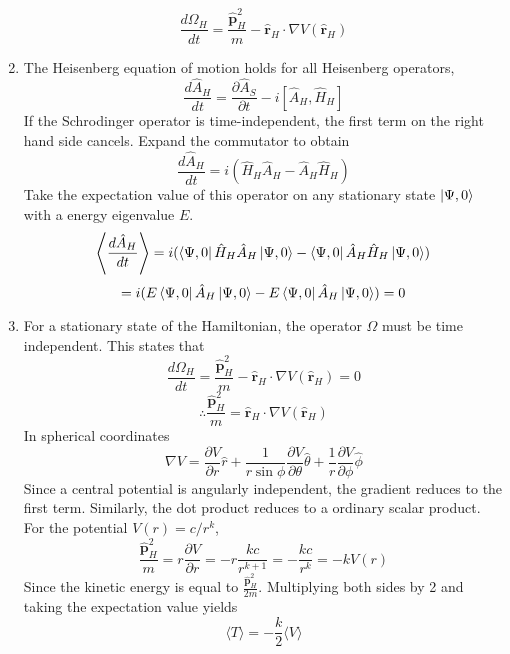 \begin{sol}
\begin{enumerate}[label=\textbf{(\alph*)}]
\begin{equation}
	\frac{d\Omega_H}{dt}=\frac{\hat{\mathbf p}_H^2}{m}-\hat {\mathbf r}_H\cdot\nabla V(\hat {\mathbf r}_H)
\end{equation} 
\item
The Heisenberg equation of motion holds for all Heisenberg operators, 
\begin{equation}
	\frac{d\hat A_H}{dt}=\frac{\partial \hat A_S}{\partial t}-i[\hat A_H,\hat H_H]
\end{equation}
If the Schrodinger operator is time-independent, the first term on the right hand side cancels. Expand the commutator to obtain
\begin{equation}
	\frac{d\hat A_H}{dt}=i(\hat H_H\hat A_H-\hat A_H\hat H_H)
\end{equation} 
Take the expectation value of this operator on any stationary state $\ket{\Psi,0}$ with a energy eigenvalue $E$.
\begin{equation}
	\left\langle\frac{d\hat A_H}{dt}\right\rangle=i(\bra{\Psi,0}\hat H_H\hat A_H\ket{\Psi,0}-\bra{\Psi,0}\hat A_H\hat H_H\ket{\Psi,0})
\end{equation}\begin{equation}
	=i(E\bra{\Psi,0}\hat A_H\ket{\Psi,0}-E\bra{\Psi,0}\hat A_H\ket{\Psi,0})=0
\end{equation}
\item
For a stationary state of the Hamiltonian, the operator $\Omega$ must be time independent. This states that
\begin{equation}
	\frac{d\Omega_H}{dt}=\frac{\hat{\mathbf p}_H^2}{m}-\hat {\mathbf r}_H\cdot\nabla V(\hat {\mathbf r}_H)=0
\end{equation} 
\begin{equation}
	\therefore\frac{\hat{\mathbf p}_H^2}{m}=\hat {\mathbf r}_H\cdot\nabla V(\hat {\mathbf r}_H)
\end{equation}
In spherical coordinates
\begin{equation}
	\nabla V=\frac{\partial V}{\partial r}\hat r+\frac{1}{r\sin\phi}\frac{\partial V}{\partial\theta}\hat\theta+\frac{1}{r}\frac{\partial V}{\partial\phi}\hat\phi
\end{equation}
Since a central potential is angularly independent, the gradient reduces to the first term. Similarly, the dot product reduces to a ordinary scalar product. For the potential $V(r)=c/r^k$,
\begin{equation}
	\frac{\hat{\mathbf p}_H^2}{m}=r\frac{\partial V}{\partial r}=-r\frac{kc}{r^{k+1}}=-\frac{kc}{r^k}=-kV(r)
\end{equation}  
Since the kinetic energy is equal to $\frac{\hat{\mathbf p}_H^2}{2m}$. Multiplying both sides by 2 and taking the expectation value yields
\begin{equation}
	\langle T\rangle=-\frac{k}{2}\langle V\rangle
\end{equation}

\end{enumerate}
\end{sol}